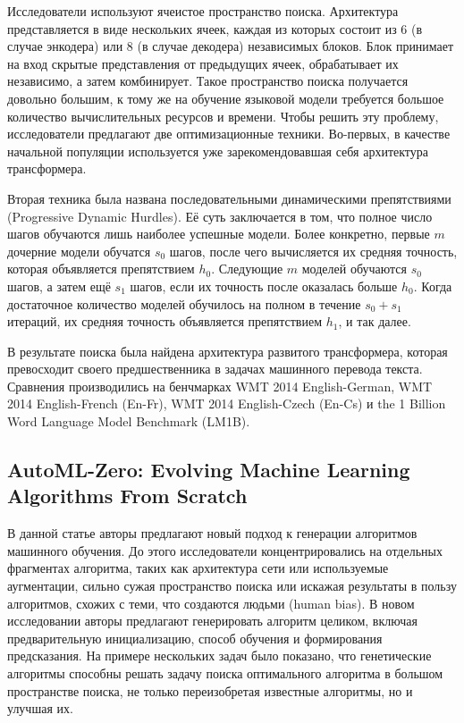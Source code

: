 \documentclass[a4paper,14pt]{extarticle}
\begin{document}
    Исследователи используют ячеистое пространство поиска.
    Архитектура представляется в виде нескольких ячеек, каждая из которых состоит из 6 (в случае энкодера) или 8 (в случае декодера) независимых блоков.
    Блок принимает на вход скрытые представления от предыдущих ячеек, обрабатывает их независимо, а затем комбинирует.
    Такое пространство поиска получается довольно большим, к тому же на обучение языковой модели требуется большое количество вычислительных ресурсов и времени.
    Чтобы решить эту проблему, исследователи предлагают две оптимизационные техники.
    Во-первых, в качестве начальной популяции используется уже зарекомендовавшая себя архитектура трансформера.

    Вторая техника была названа последовательными динамическими препятствиями (Progressive Dynamic Hurdles).
    Её суть заключается в том, что полное число шагов обучаются лишь наиболее успешные модели.
    Более конкретно, первые $m$ дочерние модели обучатся $s_0$ шагов, после чего вычисляется их средняя точность, которая объявляется препятствием $h_0$.
    Следующие $m$ моделей обучаются $s_0$ шагов, а затем ещё $s_1$ шагов, если их точность после оказалась больше $h_0$.
    Когда достаточное количество моделей обучилось на полном в течение $s_0 + s_1$ итераций, их средняя точность объявляется препятствием $h_1$, и так далее.

    В результате поиска была найдена архитектура развитого трансформера, которая превосходит своего предшественника в задачах машинного перевода текста.
    Сравнения производились на бенчмарках WMT 2014 English-German, WMT 2014 English-French (En-Fr), WMT 2014 English-Czech (En-Cs) и the 1 Billion Word Language Model Benchmark (LM1B).

\subsection{AutoML-Zero: Evolving Machine Learning Algorithms From Scratch}
    
    В данной статье авторы предлагают новый подход к генерации алгоритмов машинного обучения.
    До этого исследователи концентрировались на отдельных фрагментах алгоритма, таких как архитектура сети или используемые аугментации, сильно сужая пространство поиска или искажая результаты в пользу алгоритмов, схожих с теми, что создаются людьми (human bias).
    В новом исследовании авторы предлагают генерировать алгоритм целиком, включая предварительную инициализацию, способ обучения и формирования предсказания. На примере нескольких задач было показано, что генетические алгоритмы способны решать задачу поиска оптимального алгоритма в большом пространстве поиска, не только переизобретая известные алгоритмы, но и улучшая их.
\end{document}
